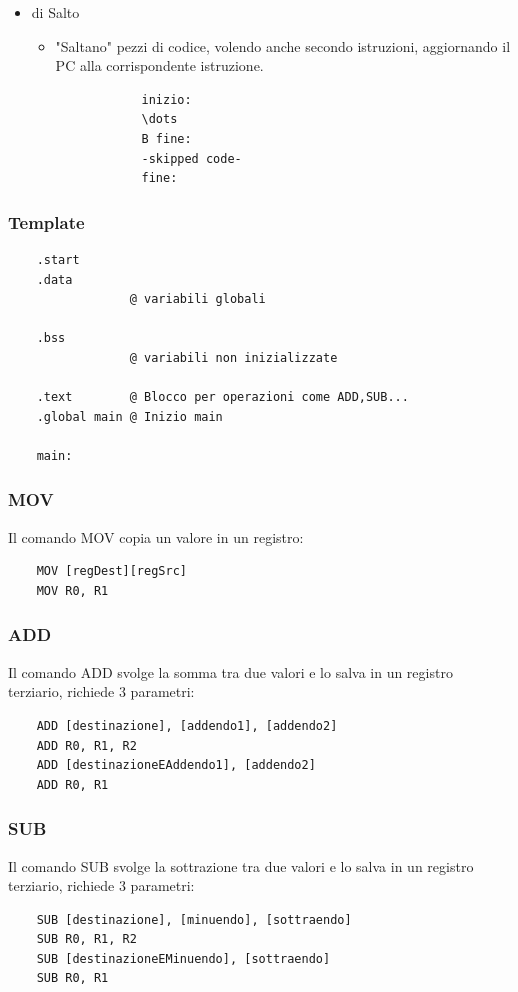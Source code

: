 \documentclass[12pt,a4paper]{article}
\begin{document}
\begin{itemize}
\begin{itemize}
\begin{itemize}
\begin{lstlisting}
            \end{lstlisting}
        \end{itemize}
    \end{itemize}
    \item di Salto
    \begin{itemize}
        \item "Saltano" pezzi di codice, volendo anche secondo istruzioni, aggiornando il PC alla corrispondente istruzione.
        \begin{lstlisting}
            inizio:
            \dots
            B fine:
            -skipped code-
            fine:
        \end{lstlisting}
    \end{itemize}
\end{itemize}
\subsubsection{Template}
\begin{lstlisting}
    .start
    .data
                 @ variabili globali
        
    .bss
                 @ variabili non inizializzate

    .text        @ Blocco per operazioni come ADD,SUB...
    .global main @ Inizio main

    main:
\end{lstlisting}
\subsubsection{MOV}
Il comando MOV copia un valore in un registro:
\begin{lstlisting}
    MOV [regDest][regSrc]
    MOV R0, R1
\end{lstlisting}
\subsubsection{ADD}
Il comando ADD svolge la somma tra due valori e lo salva in un registro terziario, richiede $3$ parametri:
\begin{lstlisting}
    ADD [destinazione], [addendo1], [addendo2]
    ADD R0, R1, R2
    ADD [destinazioneEAddendo1], [addendo2]
    ADD R0, R1
\end{lstlisting}
\subsubsection{SUB}
Il comando SUB svolge la sottrazione tra due valori e lo salva in un registro terziario, richiede $3$ parametri:
\begin{lstlisting}
    SUB [destinazione], [minuendo], [sottraendo]
    SUB R0, R1, R2
    SUB [destinazioneEMinuendo], [sottraendo]
    SUB R0, R1
\end{lstlisting}
\end{document}
